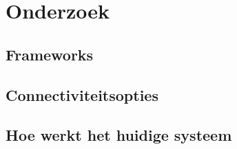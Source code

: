 \section{Onderzoek}
\subsection{Frameworks}
\subsection{Connectiviteitsopties}
\subsection{Hoe werkt het huidige systeem}